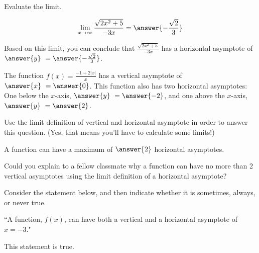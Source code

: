 \documentclass[handout]{ximera}
\begin{document}
\begin{exercise}

Evaluate the limit. 

\[ \displaystyle\lim_{x \to \infty} \frac{\sqrt{2x^2+5}}{-3x} = \answer{-\frac{\sqrt{2}}{3}} \]

\begin{exercise}

Based on this limit, you can conclude that $\frac{\sqrt{2x^2+5}}{-3x}$ has a horizontal asymptote of $\answer{y} \ = \answer{-\frac{\sqrt{2}}{3}}$.

\end{exercise}

\end{exercise}

\begin{exercise}

The function $f(x) = \frac{-1 + 2|x|}{x}$ has a vertical asymptote of $\answer{x} \ = \answer{0}$.  This function also has two horizontal asymptotes: One below the $x$-axis, $\answer{y} \ = \answer{-2}$, and one above the $x$-axis, $\answer{y} \ = \answer{2}$.  

\begin{hint}

Use the limit definition of vertical and horizontal asymptote in order to answer this question.  (Yes, that means you'll have to calculate some limits!)

\end{hint}

\end{exercise}

\begin{exercise}

A function can have a maximum of $\answer{2}$ horizontal asymptotes.  

\begin{feedback}[correct]

Could you explain to a fellow classmate why a function can have no more than 2 vertical asymptotes using the limit definition of a horizontal asymptote?  

\end{feedback}

\end{exercise}

\begin{exercise}

Consider the statement below, and then indicate whether it is sometimes, always, or never true.

\begin{center} ``A function, $f(x)$, can have both a vertical and a horizontal asymptote of $x=-3$." \end{center}

This statement is  true.

\end{exercise}
\end{document}
